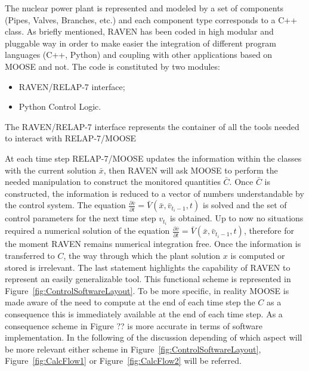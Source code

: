 \documentclass{mc2013}
\begin{document}
The nuclear power plant is represented and modeled by a set of components (Pipes, Valves, Branches, etc.) and each component type corresponds to a C++ class.
As briefly mentioned, RAVEN has been coded in high modular and pluggable way in order to make easier the integration of different program languages (C++, Python) and coupling with other applications based on MOOSE and not. The code is constituted by two modules:
\begin{itemize}
\item RAVEN/RELAP-7 interface;
\item Python Control Logic.
\end{itemize}
The RAVEN/RELAP-7 interface represents the container of all the tools needed to interact with RELAP-7/MOOSE 





At each time step RELAP-7/MOOSE updates the information within the classes with the current solution  $\bar{x}$, then RAVEN will ask MOOSE to perform the needed manipulation to construct the monitored quantities $\bar{C}$. Once $\bar{C}$ is constructed, the information is reduced to a vector of
numbers understandable by the control system. 
The equation 
$\frac{\partial \bar{v}}{\partial t} = \bar{V}(\bar{x},\bar{v}_{t_{i}-1},t) $
is solved and the set of control parameters for the next time step $v_{t_{i}}$ is obtained. 
Up to now no situations required a numerical solution of the equation 
$\frac{\partial \bar{v}}{\partial t} = \bar{V}(\bar{x},\bar{v}_{t_{i}-1},t) $, therefore for the moment RAVEN remains numerical integration free. 
Once the information is transferred to $C$, the way through which the plant
solution $x$ is computed or stored is irrelevant. The last statement highlights the capability of RAVEN to
represent an easily generalizable tool. This functional scheme is represented in Figure~\ref{fig:ControlSoftwareLayout}.
To be more specific, in reality MOOSE is made aware of the need to compute at the end of each time step the $C$ as a consequence this is immediately available at the end of each time step. As a consequence scheme in Figure ?? is more accurate in terms of software implementation. In the following of the discussion depending of which aspect will be more relevant either scheme in Figure~\ref{fig:ControlSoftwareLayout}, Figure~\ref{fig:CalcFlow1} or Figure~\ref{fig:CalcFlow2} will be referred.
\end{document}
